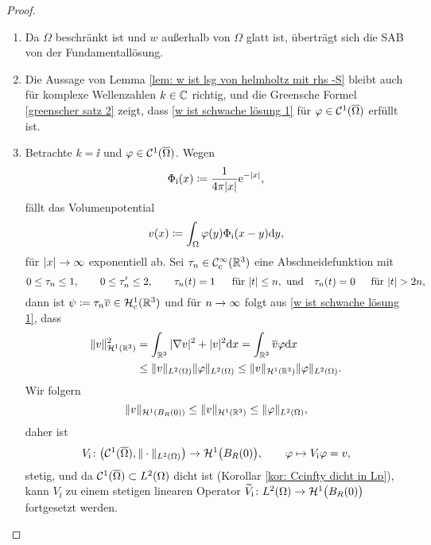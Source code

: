 \begin{proof}\
	\begin{enumerate}[label=(\roman*)]
		\item Da \(\Omega\) beschränkt ist und \(w\) außerhalb von \(\Omega\) glatt ist, überträgt sich die SAB von der Fundamentallösung.
		\item Die Aussage von Lemma \ref{lem: w ist lsg von helmholtz mit rhs -S} bleibt auch für komplexe Wellenzahlen \(k\in\mathbb{C}\) richtig, und die Greensche Formel \eqref{greenscher satz 2} zeigt, dass \eqref{w ist schwache lösung 1} für \(\varphi\in\mathcal{C}^1(\overline{\Omega})\) erfüllt ist.
		\item Betrachte \(k=\ii\) und \(\varphi\in\mathcal{C}^1(\overline{\Omega})\). Wegen
		\begin{equation*}
			\Phi_{\mathrm{i}}(x)\coloneqq\frac{1}{4\pi|x|}\mathrm{e}^{-|x|},
		\end{equation*}
		fällt das Volumenpotential 
		\begin{equation*}
			v(x)\coloneqq\int_\Omega\varphi(y)\Phi_{\mathrm{i}}(x-y)\mathrm{d}y,
		\end{equation*}
		für \(|x|\rightarrow\infty\) exponentiell ab. Sei \(\tau_n\in\mathcal{C}_{\mathrm{c}}^\infty(\mathbb{R}^3)\) eine Abschneidefunktion mit 
		\begin{equation*}
			0\leq\tau_n\leq1,\qquad0\leq\tau_n'\leq2,\qquad\tau_n(t)=1\;\quad\te{ für }|t|\leq n,\te{ und}\quad\tau_n(t)=0\,\quad\te{ für }|t|>2n,
		\end{equation*}
		dann ist \(\psi\coloneqq\tau_n\overline{v}\in\mathcal{H}_{\mathrm{c}}^1(\mathbb{R}^3)\) und für \(n\rightarrow\infty\) folgt aus \eqref{w ist schwache lösung 1}, dass
		\begin{align*}
			\|v\|_{\mathcal{H}^1(\mathbb{R}^3)}^2&=\int_{\mathbb{R}^3}|\nabla v|^2+|v|^2\mathrm{d}x
			=\int_{\mathbb{R}^3}\overline{v}\varphi\mathrm{d}x\\
			&\leq\|v\|_{L^2(\Omega)}\|\varphi\|_{L^2(\Omega)}\leq\|v\|_{\mathcal{H}^1(\mathbb{R}^3)}\|\varphi\|_{L^2(\Omega)}.
		\end{align*}
		Wir folgern
		\begin{equation*}
			\|v\|_{\mathcal{H}^1(B_R(0))}\leq\|v\|_{\mathcal{H}^1(\mathbb{R}^3)}\leq\|\varphi\|_{L^2(\Omega)},
		\end{equation*}
		daher ist
		\begin{equation*}
			V_{\mathrm{i}}\colon\big(\mathcal{C}^1(\overline{\Omega}),\|\cdot\|_{L^2(\Omega)}\big) \to \mathcal{H}^1\big(B_R(0)\big),\qquad\varphi\mapsto V_{\mathrm{i}}\varphi=v,
		\end{equation*}
		stetig, und da \(\mathcal{C}^1(\overline{\Omega})\subset L^2(\Omega)\) dicht ist (Korollar \ref{kor: Ccinfty dicht in Lp}), kann \(V_\ii\) zu einem stetigen linearen Operator \(\widetilde{V}_{\mathrm{i}}\colon L^2(\Omega) \to \mathcal{H}^1\big(B_R(0)\big)\) fortgesetzt werden.

\end{enumerate}
\end{proof}
